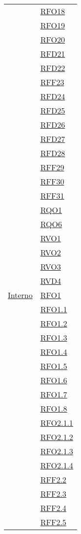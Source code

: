 \begin{longtable}{|>{\centering}m{5cm}|m{5cm}<{\centering}|}
& \hyperlink{RFO18}{RFO18}\\
& \hyperlink{RFO19}{RFO19}\\
& \hyperlink{RFO20}{RFO20}\\
& \hyperlink{RFD21}{RFD21}\\
& \hyperlink{RFD22}{RFD22}\\
& \hyperlink{RFF23}{RFF23}\\
& \hyperlink{RFD24}{RFD24}\\
& \hyperlink{RFD25}{RFD25}\\
& \hyperlink{RFD26}{RFD26}\\
& \hyperlink{RFD27}{RFD27}\\
& \hyperlink{RFD28}{RFD28}\\
& \hyperlink{RFF29}{RFF29}\\
& \hyperlink{RFF30}{RFF30}\\
& \hyperlink{RFF31}{RFF31}\\
& \hyperlink{RQO1}{RQO1}\\
& \hyperlink{RQO6}{RQO6}\\
& \hyperlink{RVO1}{RVO1}\\
& \hyperlink{RVO2}{RVO2}\\
& \hyperlink{RVO3}{RVO3}\\
& \hyperlink{RVD4}{RVD4}\\ \hline
\hyperlink{Interno}{Interno} & \hyperlink{RFO1}{RFO1}\\
& \hyperlink{RFO1.1}{RFO1.1}\\
& \hyperlink{RFO1.2}{RFO1.2}\\
& \hyperlink{RFO1.3}{RFO1.3}\\
& \hyperlink{RFO1.4}{RFO1.4}\\
& \hyperlink{RFO1.5}{RFO1.5}\\
& \hyperlink{RFO1.6}{RFO1.6}\\
& \hyperlink{RFO1.7}{RFO1.7}\\
& \hyperlink{RFO1.8}{RFO1.8}\\
& \hyperlink{RFO2.1.1}{RFO2.1.1}\\
& \hyperlink{RFO2.1.2}{RFO2.1.2}\\
& \hyperlink{RFO2.1.3}{RFO2.1.3}\\
& \hyperlink{RFO2.1.4}{RFO2.1.4}\\
& \hyperlink{RFF2.2}{RFF2.2}\\
& \hyperlink{RFF2.3}{RFF2.3}\\
& \hyperlink{RFF2.4}{RFF2.4}\\
& \hyperlink{RFF2.5}{RFF2.5}\\

\end{longtable}

